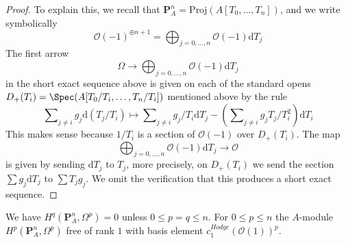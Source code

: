 \begin{proof}
To explain this, we recall that
$\mathbf{P}^n_A = \text{Proj}(A[T_0, \ldots, T_n])$,
and we write symbolically
$$
\mathcal{O}(-1)^{\oplus n + 1} =
\bigoplus\nolimits_{j = 0, \ldots, n} \mathcal{O}(-1) \text{d}T_j
$$
The first arrow
$$
\Omega \to
\bigoplus\nolimits_{j = 0, \ldots, n} \mathcal{O}(-1) \text{d}T_j
$$
in the short exact sequence above
is given on each of the standard opens
$D_+(T_i) = \Spec(A[T_0/T_i, \ldots, T_n/T_i])$
mentioned above by the rule
$$
\sum\nolimits_{j \not = i} g_j \text{d}(T_j/T_i)
\longmapsto
\sum\nolimits_{j \not = i} g_j/T_i \text{d}T_j
- (\sum\nolimits_{j \not = i} g_jT_j/T_i^2) \text{d}T_i
$$
This makes sense because $1/T_i$ is a section of $\mathcal{O}(-1)$
over $D_+(T_i)$. The map
$$
\bigoplus\nolimits_{j = 0, \ldots, n} \mathcal{O}(-1) \text{d}T_j
\to
\mathcal{O}
$$
is given by sending $\text{d}T_j$ to $T_j$, more precisely, on
$D_+(T_i)$ we send the section $\sum g_j \text{d}T_j$ to
$\sum T_jg_j$. We omit the verification that this produces
a short exact sequence.
\end{proof}

\begin{lemma}
\label{lemma-hodge-cohomology-projective-space}
We have $H^q(\mathbf{P}^n_A, \Omega^p) = 0$
unless $0 \leq p = q \leq n$. For $0 \leq p \leq n$ the $A$-module
$H^p(\mathbf{P}^n_A, \Omega^p)$ free of rank $1$ with basis element
$c_1^{Hodge}(\mathcal{O}(1))^p$.
\end{lemma}

